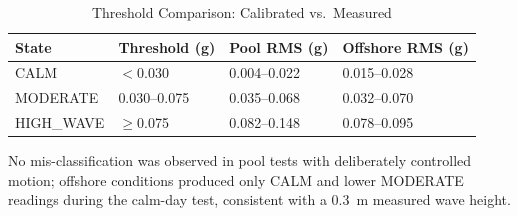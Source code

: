\begin{table}[H]
\centering
\caption{Threshold Comparison: Calibrated vs.\ Measured}
\label{tab:thresholds}
\begin{tabular}{llll}
\toprule
\textbf{State}       & \textbf{Threshold (g)} & \textbf{Pool RMS (g)} & \textbf{Offshore RMS (g)} \\
\midrule
CALM                 & $<$0.030               & 0.004--0.022          & 0.015--0.028 \\
MODERATE             & 0.030--0.075           & 0.035--0.068          & 0.032--0.070 \\
HIGH\_WAVE           & $\geq$0.075            & 0.082--0.148          & 0.078--0.095 \\
\bottomrule
\end{tabular}
\end{table}

No mis-classification was observed in pool tests with deliberately controlled
motion; offshore conditions produced only CALM and lower MODERATE readings during
the calm-day test, consistent with a 0.3~m measured wave height.
